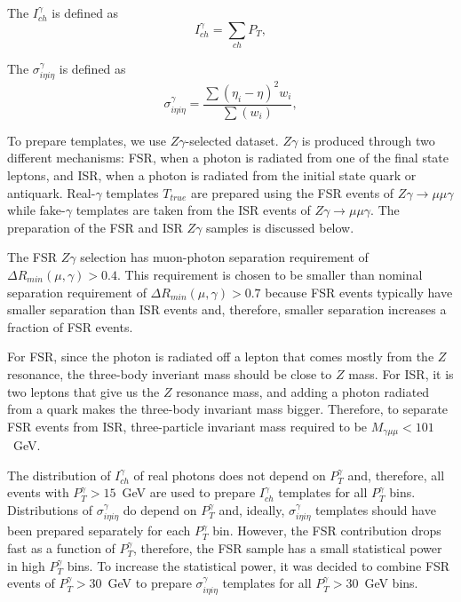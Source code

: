 The $I_{ch}^{\gamma}$ is defined as
\begin{equation}
  I_{ch}^{\gamma} = \sum_{ch} P_T,
\end{equation} 

The $\sigma_{i\eta i\eta}^{\gamma}$ is defined as
\begin{equation}
  \sigma_{i\eta i\eta}^{\gamma} = \frac{\sum{(\eta_i-\eta)^2 w_i}}{\sum(w_i)},
\end{equation}

To prepare templates, we use $Z\gamma$-selected dataset. $Z\gamma$ is produced through two different mechanisms: FSR, when a photon is radiated from one of the final state leptons, and ISR, when a photon is radiated from the initial state quark or antiquark. Real-$\gamma$ templates $T_{true}$ are prepared using the FSR events of $Z\gamma\rightarrow\mu\mu\gamma$ while fake-$\gamma$ templates are taken from the ISR events of $Z\gamma\rightarrow\mu\mu\gamma$. The preparation of the FSR and ISR $Z\gamma$ samples is discussed below.

The FSR $Z\gamma$ selection has muon-photon separation requirement of $\Delta R_{min}(\mu,\gamma)>0.4$. This requirement is chosen to be smaller than nominal separation requirement of $\Delta R_{min}(\mu,\gamma)>0.7$ because FSR events typically have smaller separation than ISR events and, therefore, smaller separation increases a fraction of FSR events. 

For FSR, since the photon is radiated off a lepton that comes mostly from the $Z$ resonance, the three-body inveriant mass should be close to $Z$ mass. For ISR, it is two leptons that give us the $Z$ resonance mass, and adding a photon radiated from a quark makes the three-body invariant mass bigger. Therefore, to separate FSR events from ISR, three-particle invariant mass required to be $M_{\gamma\mu\mu}<101$~GeV. 

The distribution of $I_{ch}^{\gamma}$ of real photons does not depend on $P_{T}^{\gamma}$ and, therefore, all events with $P_{T}^{\gamma}>15$~GeV are used to prepare $I_{ch}^{\gamma}$ templates for all $P_T^{\gamma}$ bins. Distributions of $\sigma_{i\eta i\eta}^{\gamma}$ do depend on $P_T^{\gamma}$ and, ideally,  $\sigma_{i\eta i\eta}^{\gamma}$ templates should have been prepared separately for each $P_T^{\gamma}$ bin. However, the FSR contribution drops fast as a function of $P_{T}^{\gamma}$, therefore, the FSR sample has a small statistical power in high $P_{T}^{\gamma}$ bins. To increase the statistical power, it was decided to combine FSR events of $P_T^{\gamma}>30$~GeV to prepare $\sigma_{i\eta i\eta}^{\gamma}$ templates for all $P_T^{\gamma}>30$~GeV bins. 

